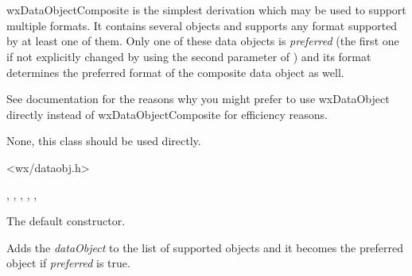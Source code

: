 
\section{}\label{wxdataobjectcomposite}

wxDataObjectComposite is the simplest 
 derivation which may be used to support
multiple formats. It contains several 
 objects and supports any
format supported by at least one of them. Only one of these data objects is
{\it preferred} (the first one if not explicitly changed by using the second
parameter of ) and its format determines
the preferred format of the composite data object as well.

See  documentation for the reasons why you
might prefer to use wxDataObject directly instead of wxDataObjectComposite for
efficiency reasons.


None, this class should be used directly.




<wx/dataobj.h>


, 
, 
, 
, 
, 


\label{wxdataobjectcompositewxdataobjectcomposite}


The default constructor.

\label{wxdataobjectcompositeadd}


Adds the {\it dataObject} to the list of supported objects and it becomes the
preferred object if {\it preferred} is true.


